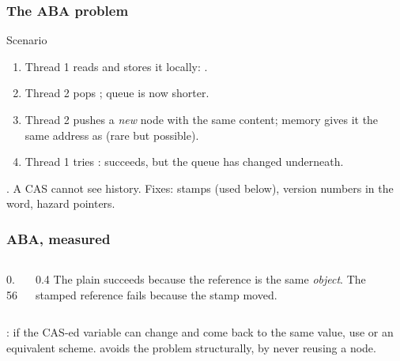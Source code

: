 \documentclass[aspectratio=169,10pt,compress]{beamer}
\begin{document}
\begin{frame}[t,fragile] \frametitle{The ABA problem}
  \begin{block}{Scenario}
    \small
    \begin{enumerate}
      \item Thread 1 reads  and stores it locally: .
      \item Thread 2 pops ; queue is now shorter.
      \item Thread 2 pushes a \emph{new} node with the same content;
            memory gives it the same address as  (rare but possible).
      \item Thread 1 tries : succeeds,
            but the queue has changed underneath.
    \end{enumerate}
  \end{block}
  \vspace{0.2em}
  \small
  . A CAS cannot see
  history. Fixes: stamps (used below), version numbers in the word,
  hazard pointers.
\end{frame}




\begin{frame}[t,fragile] \frametitle{ABA, measured}
  \begin{columns}[T]
    \begin{column}{0.56\textwidth}
    \end{column}
    \begin{column}{0.4\textwidth}
      \small
      The plain  succeeds because
      the reference is the same \emph{object}. The stamped reference
      fails because the stamp moved.
    \end{column}
  \end{columns}
  \vspace{0.2em}
  \small
  : if the CAS-ed variable can change and come back to
  the same value, use  or an equivalent
  scheme.  avoids the problem structurally,
  by never reusing a node.
\end{frame}
\end{document}
